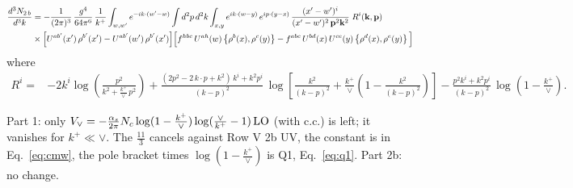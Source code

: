 \documentclass[9pt]{article}
\newcommand{\new}[1]{{\color{blue}#1}}
\numberwithin{equation}{section}
\begin{document}
\begin{align}
\frac{d^{3}N_{2\,b}}{d^{3}k} & = -\frac{1}{(2\pi)^{3}}\,\frac{g^{4}}{64\pi^{6}}\,\frac{1}{k^{+}}\int_{w,w'} e^{-ik\cdot(w'-w)}
\int d^{2}p\,d^{2}k\int_{x,y} e^{ik\cdot(w-y)}\,e^{ip\cdot(y-x)}\,\frac{(x'-w')^{i}}{(x'-w')^{2}\,\mathbf{p}^{2}\mathbf{k}^{2}}\;R^{i}(\mathbf{k},\mathbf{p})\notag\\
&\times\Big[U^{ab'}(x')\,\rho^{b'}(x')-U^{ab'}(w')\,\rho^{b'}(x')\Big]
\Big[f^{hbc}\,U^{ah}(w)\left\{\rho^{b}(x),\rho^{c}(y)\right\}-f^{abc}\,U^{bd}(x)\,U^{ce}(y)\left\{\rho^{d}(x),\rho^{e}(y)\right\}\Big]
\end{align}
where
\begin{align}
R^{i} =& -2k^{i}\log\left(\frac{p^{2}}{k^{2}+\frac{k^{+}}{\vee}\,p^{2}}\right)
+\frac{(2p^{2}-2\,k\cdot p+k^{2})\,k^{i}+k^{2}p^{i}}{(k-p)^{2}}\,
\log\left[\frac{k^{2}}{(k-p)^{2}}+\frac{k^{+}}{\vee}\left(1-\frac{k^{2}}{(k-p)^{2}}\right)\right]
-\frac{p^{2}k^{i}+k^{2}p^{i}}{(k-p)^{2}}\,\log\left(1-\frac{k^{+}}{\vee}\right).
\end{align}

\new{Part 1: only $V_\vee=-\frac{\alpha_s}{2\pi}N_c\log(1-\frac{k^+}{\vee})\log(\frac{\vee}{k^+}-1)\,{\rm LO}$ (with c.c.) is left; it vanishes for $k^+\ll\vee$. The $\frac{11}{3}$ cancels against Row V 2b UV, the constant is in Eq.~\eqref{eq:cmw}, the pole bracket times $\log(1-\frac{k^+}{\vee})$ is Q1, Eq.~\eqref{eq:q1}. Part 2b: no change.}
\end{document}

